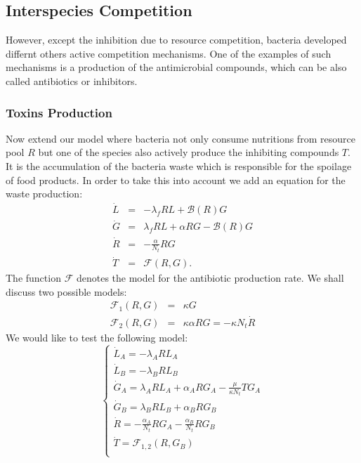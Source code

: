 \documentclass[10pt,A4paper]{article}
\begin{document}

\subsection{Interspecies Competition}

However, except the inhibition due to resource competition, bacteria developed differnt others active competition mechanisms.
One of the examples of such mechanisms is a production of the antimicrobial compounds, which can be also called antibiotics or inhibitors. 


\subsubsection{Toxins Production}
Now extend our model where bacteria not only consume nutritions from resource pool $R$ but one of the species also actively produce the inhibiting compounds $T$. 
It is the accumulation of the bacteria waste which is responsible for the spoilage of food products. 
In order to take this into account we add an equation for the waste production:
\begin{eqnarray}
\dot{L} &=& - \lambda_f R L + \mathcal{B}(R)G\\
\dot{G} &=& \lambda_f R L +\alpha R G-\mathcal{B}(R)G\\
\dot{R} &=&-\frac{\alpha}{N_t} R G\\
\dot{T} &=& \mathcal{F}(R,G).
\end{eqnarray}
The function $\mathcal{F}$ denotes the model for the antibiotic production rate. 
We shall discuss two possible models:
\begin{eqnarray}
\mathcal{F}_1(R,G)&=&\kappa G\\
\mathcal{F}_2(R,G)&=&\kappa\alpha R G=-\kappa N_t\dot{R}
\end{eqnarray}
We would like to test the following model:
\begin{equation}
    \begin{cases}
        \dot{L}_A = - \lambda_A R L_A\\
        \dot{L}_B = - \lambda_B R L_B \\
        \dot{G}_A = \lambda_A R L_A + \alpha_A R G_A - \frac{\mu}{\kappa N_t} T G_A\\
        \dot{G}_B = \lambda_B R L_B + \alpha_B R G_B\\
        \dot{R} = -\frac{\alpha_A}{N_t} R G_A-\frac{\alpha_B}{N_t} R G_B\\
        \dot{T} = \mathcal{F}_{1,2} (R, G_B) \\
    \end{cases}
    \label{eq:model_2sp_toxin}
\end{equation}
\end{document}
